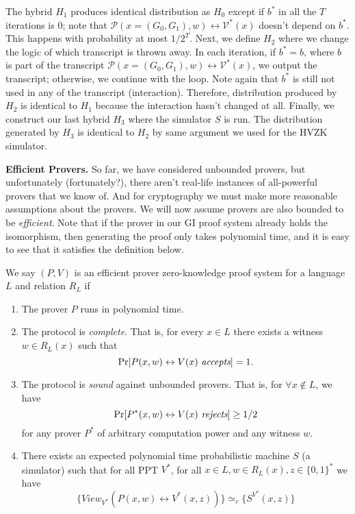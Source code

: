 The hybrid $H_1$ produces identical distribution as $H_0$ except if $b^*$ in all the $T$ iterations is $0$; note that $\mathcal{P}(x=(G_0, G_1), w)\leftrightarrow \mathcal{V^*}(x)$ doesn't depend on $b^*$. This happens with probability at most $1/2^T$. Next, we define $H_2$ where we change the logic of which transcript is thrown away. In each iteration, if $b^* = b$, where $b$ is part of the transcript $\mathcal{P}(x=(G_0, G_1), w)\leftrightarrow \mathcal{V^*}(x)$, we output the transcript; otherwise, we continue with the loop. Note again that $b^*$ is still not used in any of the transcript (interaction). Therefore, distribution produced by $H_2$ is identical to $H_1$ because the interaction hasn't changed at all. Finally, we construct our last hybrid $H_3$ where the simulator $S$ is run. The distribution generated by $H_3$ is identical to $H_2$ by same argument we used for the HVZK simulator. \bigskip


\noindent\textbf{Efficient Provers.} So far, we have considered unbounded provers, but unfortunately (fortunately?), there aren't real-life instances of all-powerful provers that we know of. And for cryptography we must make more reasonable assumptions about the provers.  We will now assume provers are also bounded to be \emph{efficient}. Note that if the prover in our GI proof system already holds the isomorphism, then generating the proof only takes polynomial time, and it is easy to see that it satisfies the definition below. \smallskip

\begin{definition}
We say $(P, V)$ is an efficient prover zero-knowledge proof system for a language $L$ and relation $R_L$ if \begin{enumerate}

\item The prover $P$ runs in polynomial time.

\item The protocol is \emph{complete}. That is, for every $x \in L$ there exists a witness $w \in R_L (x)$ such that $$\Pr [P(x,w) \leftrightarrow V(x) \ \emph{accepts}] = 1.$$

\item The protocol is \emph{sound} against unbounded provers. That is, for $\forall x \notin L$, we have $$\Pr [P^*(x,w) \leftrightarrow V(x) \ \emph{rejects}] \geq 1/2$$ for any prover $P^*$ of arbitrary computation power and any witness $w$.

\item There exists an expected polynomial time probabilistic machine $S$ (a simulator) such that for all PPT $V^*$, for all $x \in L, w \in R_L (x), z \in \{ 0, 1 \}^*$ we have $$\{ View_{V^*} (P(x,w) \leftrightarrow V^* (x,z)) \} \simeq_c \{ S^{V^*} (x,z) \} $$ \end{enumerate}

\end{definition}

